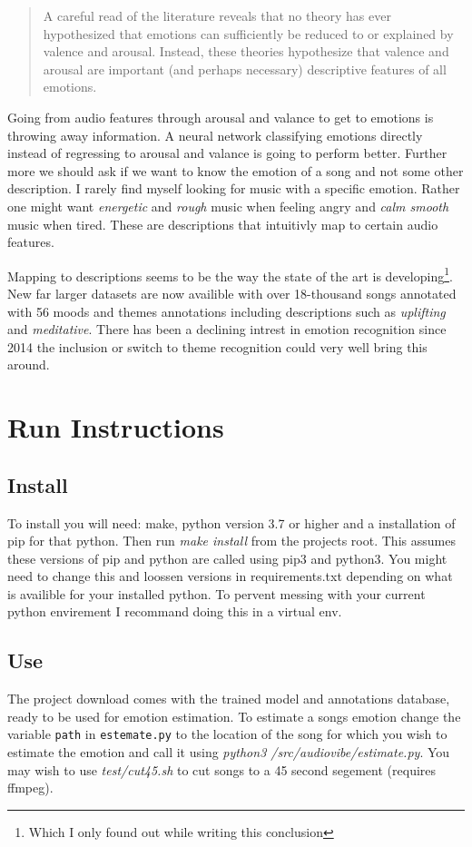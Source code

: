\documentclass[lang=en, hanging-titles=true]{skrapport}
\begin{document}
\blockquote{
A careful read of the literature reveals that no theory has ever hypothesized that emotions can sufficiently be reduced to or explained by valence and arousal. Instead, these theories hypothesize that valence and arousal are important (and perhaps necessary) descriptive features of all emotions.
}

Going from audio features through arousal and valance to get to emotions is throwing away information. A neural network classifying emotions directly instead of regressing to arousal and valance is going to perform better. Further more we should ask if we want to know the emotion of a song and not some other description. I rarely find myself looking for music with a specific emotion. Rather one might want \textit{energetic} and \textit{rough} music when feeling angry and \textit{calm smooth} music when tired. These are descriptions that intuitivly map to certain audio features.

Mapping to descriptions seems to be the way the state of the art is developing\footnote{Which I only found out while writing this conclusion}. New far larger datasets are now availible with over 18-thousand songs annotated with 56 moods and themes annotations including descriptions such as \textit{uplifting} and \textit{meditative}\cite{themes}. There has been a declining intrest in emotion recognition since 2014 the inclusion or switch to theme recognition could very well bring this around.

\clearpage
\appendix
\section{Run Instructions}
\subsection*{Install}
To install you will need: make, python version 3.7 or higher and a installation of pip for that python. Then run \textit{make install} from the projects root. This assumes these versions of pip and python are called using pip3 and python3. You might need to change this and loossen versions in requirements.txt depending on what is availible for your installed python. To pervent messing with your current python envirement I recommand doing this in a virtual env.

\subsection*{Use}
The project download comes with the trained model and annotations database, ready to be used for emotion estimation. To estimate a songs emotion change the variable \texttt{path} in \texttt{estemate.py} to the location of the song for which you wish to estimate the emotion and call it using \textit{python3 /src/audiovibe/estimate.py}. You may wish to use \textit{test/cut45.sh} to cut songs to a 45 second segement (requires ffmpeg).

\printbibliography
\end{document}
